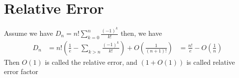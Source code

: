 \documentclass[11pt]{article}
\begin{document}
\section*{Relative Error}
Assume we have \(D_n=n!\sum_{k=0}^n\frac{(-1)^k}{k!}\) then, we have
\begin{align*}
D_n &= n!\left(\frac{1}{e}-\sum_{k>n}\frac{(-1)^k}{k!}\right)+O\left(\frac{1}{(n+1)!}\right) 
	&= \frac{n!}{e}-O(\frac{1}{n})
\end{align*}
Then \(O(1)\) is called the relative error, and \(\left(1+O(1)\right)\) is called relative error factor \\
\end{document}
